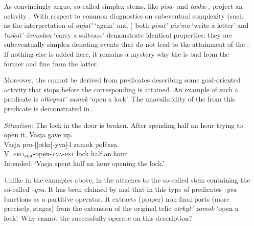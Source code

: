 \documentclass[output=paper,colorlinks,citecolor=brown,newtxmath]{langsci/langscibook}
\begin{document}
\z

\z

\noindent As \citet{pazelskaya2006} convincingly argue, so-called simplex  stems, like \textit{pisa-} and \textit{taska-}, project an activity . With respect to common diagnostics on subeventual complexity (such as the interpretation of \textit{opjat’} `again' and ) both \textit{pisat’ pis’mo} `write a letter' and \textit{taskat’ čemodan} `carry a suitcase'
 demonstrate identical properties: they are subeventually simplex denoting events that do not lead to the attainment of the . If nothing else is added here, it remains a mystery why the  is bad from the former and fine from the latter.

Moreover, the  cannot be derived from predicates describing some goal-oriented activity that stops before the corresponding  is attained. An example of such a predicate is \textit{otkryvat' zamok} `open a lock'. The unavailability of the  from this predicate is demonstrated in .

\ea \textit{Situation:} The lock in the door is broken. After spending half an hour trying to open it, Vasja gave up.\medskip\\
\gll *\hspace{-2pt} Vasja		pro-[[otkr]-yva]-l		zamok		polčasa.\\
     {} V.
     \textsc{pro}$_\textsc{per}$-open-\textsc{yva}-\textsc{pst}	lock		half.an.hour\\
\glt Intended: `Vasja spent half an hour opening the lock.' \label{ex:naumov:4}
\z

\noindent Unlike in the examples above, in  the  attaches to the so-called   stem containing the so-called  \textit{-yva}. It has been claimed by \citet{altshuler2013,altshuler2014} and \citet{tatevosov2017temporal} that in this type of predicates \textit{-yva} functions as a partitive operator. It extracts (proper) non-final parts (more precisely, stages) from the extension of the original telic  \textit{otrkyt’ zamok} `open a lock'. Why cannot the  successfully operate on this  description?
\end{document}
